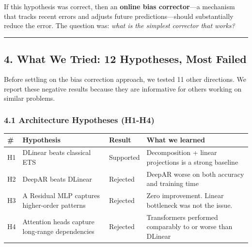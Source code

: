 If this hypothesis was correct, then an \textbf{online bias
corrector}---a mechanism that tracks recent errors and adjusts future
predictions---should substantially reduce the error. The question was:
\emph{what is the simplest corrector that works?}

\begin{center}\rule{0.5\linewidth}{0.5pt}\end{center}

\subsection{4. What We Tried: 12 Hypotheses, Most
Failed}\label{what-we-tried-12-hypotheses-most-failed}

Before settling on the bias correction approach, we tested 11 other
directions. We report these negative results because they are
informative for others working on similar problems.

\subsubsection{4.1 Architecture Hypotheses
(H1-H4)}\label{architecture-hypotheses-h1-h4}

{\def\LTcaptype{none} %
\begin{longtable}[]{@{}
  >{\raggedright\arraybackslash}p{}
  >{\raggedright\arraybackslash}p{}
  >{\raggedright\arraybackslash}p{}
  >{\raggedright\arraybackslash}p{}@{}}
\toprule\noalign{}
\begin{minipage}[b]{\linewidth}\raggedright
\#
\end{minipage} & \begin{minipage}[b]{\linewidth}\raggedright
Hypothesis
\end{minipage} & \begin{minipage}[b]{\linewidth}\raggedright
Result
\end{minipage} & \begin{minipage}[b]{\linewidth}\raggedright
What we learned
\end{minipage} \\
\midrule\noalign{}
\endhead
\bottomrule\noalign{}
\endlastfoot
H1 & DLinear beats classical ETS & Supported & Decomposition + linear
projections is a strong baseline \\
H2 & DeepAR beats DLinear & Rejected & DeepAR worse on both accuracy and
training time \\
H3 & A Residual MLP captures higher-order patterns & Rejected & Zero
improvement. Linear bottleneck was not the issue. \\
H4 & Attention heads capture long-range dependencies & Rejected &
Transformers performed comparably to or worse than DLinear \\
\end{longtable}
}

